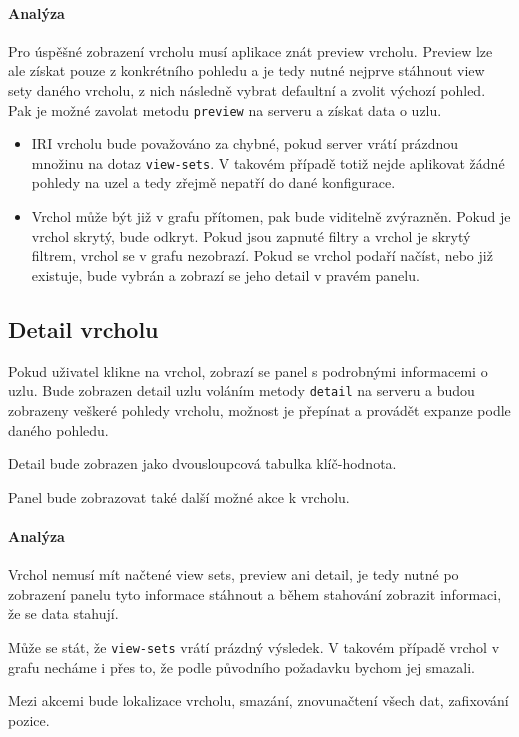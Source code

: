 \paragraph{Analýza} Pro úspěšné zobrazení vrcholu musí aplikace znát preview vrcholu. Preview lze ale získat pouze z konkrétního pohledu a je tedy nutné nejprve stáhnout view sety daného vrcholu, z nich následně vybrat defaultní a zvolit výchozí pohled. Pak je možné zavolat metodu \texttt{preview} na serveru a získat data o uzlu.

\begin{itemize}
    \item IRI vrcholu bude považováno za chybné, pokud server vrátí prázdnou množinu na dotaz \texttt{view-sets}. V takovém případě totiž nejde aplikovat žádné pohledy na uzel a tedy zřejmě nepatří do dané konfigurace.
    \item Vrchol může být již v grafu přítomen, pak bude viditelně zvýrazněn. Pokud je vrchol skrytý, bude odkryt. Pokud jsou zapnuté filtry a vrchol je skrytý filtrem, vrchol se v grafu nezobrazí. Pokud se vrchol podaří načíst, nebo již existuje, bude vybrán a zobrazí se jeho detail v pravém panelu.
\end{itemize}

\subsection{Detail vrcholu}
Pokud uživatel klikne na vrchol, zobrazí se panel s podrobnými informacemi o uzlu. Bude zobrazen detail uzlu voláním metody \texttt{detail} na serveru a budou zobrazeny veškeré pohledy vrcholu, možnost je přepínat a provádět expanze podle daného pohledu.

Detail bude zobrazen jako dvousloupcová tabulka klíč-hodnota.

Panel bude zobrazovat také další možné akce k vrcholu.

\paragraph{Analýza} Vrchol nemusí mít načtené view sets, preview ani detail, je tedy nutné po zobrazení panelu tyto informace stáhnout a během stahování zobrazit informaci, že se data stahují.

Může se stát, že \texttt{view-sets} vrátí prázdný výsledek. V takovém případě vrchol v grafu necháme i přes to, že podle původního požadavku bychom jej smazali.

Mezi akcemi bude lokalizace vrcholu, smazání, znovunačtení všech dat, zafixování pozice.

